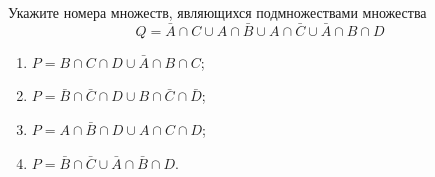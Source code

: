 \question
Укажите номера множеств, являющихся подмножествами множества
\begin{equation*}
	Q = \bar{A} \cap C \cup A \cap \bar{B} \cup A \cap \bar{C} \cup \bar{A} \cap B \cap D
\end{equation*}

\begin{enumerate}
	\renewcommand{\labelenumi}{\arabic{enumi})}
	\item $P = B \cap C \cap D \cup \bar{A} \cap B \cap C$;
	\item $P = \bar{B} \cap \bar{C} \cap D \cup B \cap \bar{C} \cap \bar{D}$;
	\item $P = A \cap \bar{B} \cap D \cup A \cap C \cap D$;
	\item $P = \bar{B} \cap \bar{C} \cup \bar{A} \cap \bar{B} \cap D$.
\end{enumerate}
